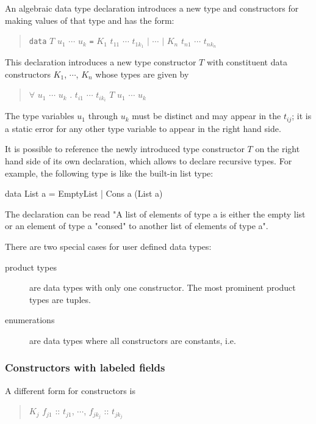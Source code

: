 An algebraic data type declaration introduces a new type and constructors for making values of that type and has the form:
\begin{quote}
\texttt{data} $T$ $u_1$ $\cdots$ $u_k$ \texttt{=} $K_1$ $t_{11}$ $\cdots$ $t_{1k_1}$ $|$ $\cdots$ $|$ $K_n$ $t_{n1}$ $\cdots$ $t_{nk_n}$
\end{quote}

This declaration introduces a new type constructor $T$ with constituent data constructors $K_1$, $\cdots$, $K_n$ whose types are given by
\begin{quote}
$\forall$ $u_1$ $\cdots$ $u_k$ . $t_{i1}$ \arrow{} $\cdots$ \arrow{} $t_{ik_i}$ \arrow{} $T$ $u_1$ $\cdots$ $u_k$
\end{quote}

The type variables $u_1$ through $u_k$ must be distinct and may appear in the $t_{ij}$; it is a static error for any other type variable to appear in the right hand side.

It is possible to reference the newly introduced type constructor $T$ on the right hand side of its own declaration, which allows to declare recursive types. For example, the following type is like the built-in list type:

\begin{code}
data List a = EmptyList | Cons a (List a)
\end{code}

The declaration can be read "A list of elements of type a is either the empty list or an element of type a "consed" to another list of elements of type a".

There are two special cases for user defined data types:
\begin{description}
\item [product types] are data types with only one constructor. The most prominent product types are tuples.
\item [enumerations] are data types where all constructors are constants, i.e. 
\end{description}

\subsubsection{Constructors with labeled fields} \label{fieldconstructor}

A different form for constructors is

\begin{quote}
$K_j$ \bracea{} $f_{j1}$ :: $t_{j1}$, $\cdots$, $f_{j{k_j}}$ :: $t_{j{k_j}}$ \bracez{}
\end{quote}

